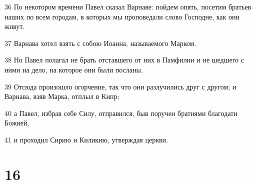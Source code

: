\par 36 По некотором времени Павел сказал Варнаве: пойдем опять, посетим братьев наших по всем городам, в которых мы проповедали слово Господне, как они живут.
\par 37 Варнава хотел взять с собою Иоанна, называемого Марком.
\par 38 Но Павел полагал не брать отставшего от них в Памфилии и не шедшего с ними на дело, на которое они были посланы.
\par 39 Отсюда произошло огорчение, так что они разлучились друг с другом; и Варнава, взяв Марка, отплыл в Кипр;
\par 40 а Павел, избрав себе Силу, отправился, быв поручен братиями благодати Божией,
\par 41 и проходил Сирию и Киликию, утверждая церкви.

\chapter{16}

